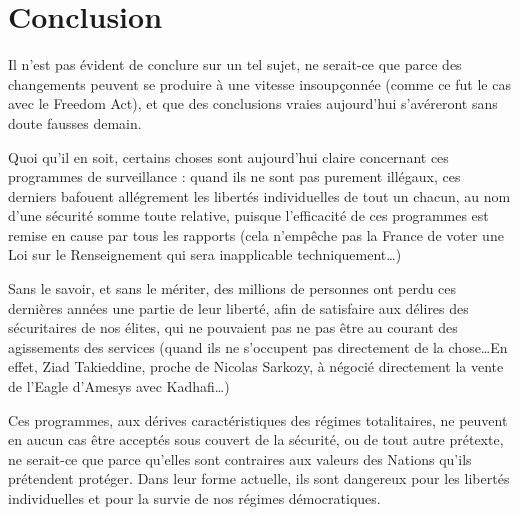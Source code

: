\chapter{Conclusion}
\label{ch:conclu}

Il n'est pas évident de conclure sur un tel sujet, ne serait-ce que
parce des changements peuvent se produire à une vitesse insoupçonnée (comme ce
fut le cas avec le Freedom Act), et que des conclusions vraies aujourd'hui
s'avéreront sans doute fausses demain.

Quoi qu'il en soit, certains choses sont aujourd'hui claire
concernant ces programmes de surveillance : quand ils ne sont pas purement
illégaux, ces derniers bafouent allégrement les libertés individuelles de tout
un chacun, au nom d'une sécurité somme toute relative, puisque l'efficacité de
ces programmes est remise en cause par tous les rapports (cela n'empêche pas la
France de voter une Loi sur le Renseignement qui sera inapplicable
techniquement\ldots)

Sans le savoir, et sans le mériter, des millions de personnes ont
perdu ces dernières années une partie de leur liberté, afin de satisfaire aux
délires des sécuritaires de nos élites, qui ne pouvaient pas ne pas être au
courant des agissements des services (quand ils ne s'occupent pas directement de
la chose\ldots En effet, Ziad Takieddine, proche de Nicolas Sarkozy, à négocié
directement la vente de l'Eagle d'Amesys avec Kadhafi\ldots)

Ces programmes, aux dérives caractéristiques des régimes
totalitaires, ne peuvent en aucun cas être acceptés sous couvert de la sécurité, ou de tout autre
prétexte, ne serait-ce que parce qu'elles sont contraires aux valeurs des
Nations qu'ils prétendent protéger.  Dans leur forme actuelle, ils sont
dangereux pour les libertés individuelles et pour la survie de nos régimes
démocratiques.
